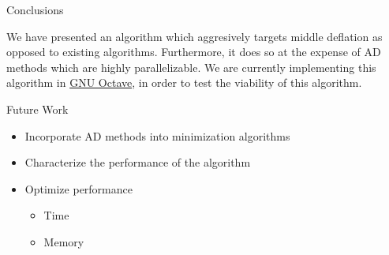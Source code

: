 \documentclass[final]{beamer}
\newlength{\onecolwid}
\begin{document}
\begin{frame}[t]
\begin{columns}[t]
\begin{column}{\onecolwid} %


\begin{block}{Conclusions}

We have presented an algorithm which aggresively targets
middle deflation as opposed to existing algorithms.
Furthermore, it does so at the expense of AD methods which
are highly parallelizable.
We are currently implementing this algorithm in
\href{http://octave.org/}{GNU Octave}, in order to
test the viability of this algorithm.


\end{block}


\begin{block}{Future Work}

\begin{itemize}
  \item Incorporate AD methods into minimization algorithms
  \item Characterize the performance of the algorithm
  \item Optimize performance
  \begin{itemize}
    \item Time
    \item Memory
  \end{itemize}
\end{itemize}


\end{block}



\end{column}
\end{columns}
\end{frame}
\end{document}

